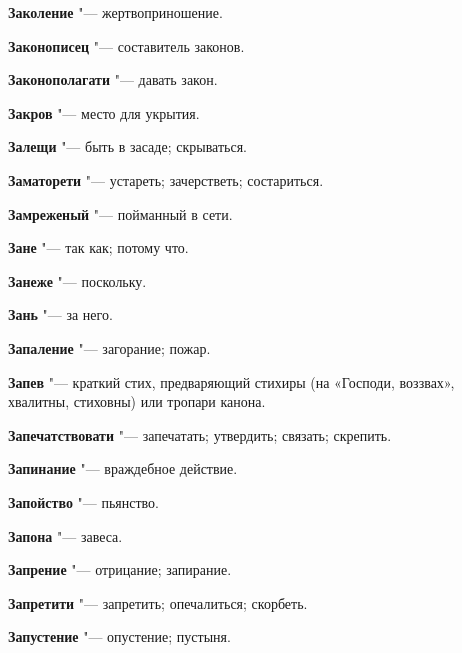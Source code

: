 \begin{mymulticols}{2}
\noindent\textbf{Заколение} "--- жертвоприношение. 




\noindent\textbf{Законописец} "--- составитель законов. 




\noindent\textbf{Законополагати} "--- давать закон. 




\noindent\textbf{Закров} "--- место для укрытия. 




\noindent\textbf{Залещи} "--- быть в засаде; скрываться. 




\noindent\textbf{Заматорети} "--- устареть; зачерстветь; состариться. 




\noindent\textbf{Замреженый} "--- пойманный в сети. 




\noindent\textbf{Зане} "--- так как; потому что. 




\noindent\textbf{Занеже} "--- поскольку. 




\noindent\textbf{Зань} "--- за него. 




\noindent\textbf{Запаление} "--- загорание; пожар. 




\noindent\textbf{Запев} "--- краткий стих, предваряющий стихиры (на «Господи, воззвах», хвалитны, стиховны) или тропари канона. 




\noindent\textbf{Запечатствовати} "--- запечатать; утвердить; связать; скрепить. 




\noindent\textbf{Запинание} "--- враждебное действие. 




\noindent\textbf{Запойство} "--- пьянство. 




\noindent\textbf{Запона} "--- завеса. 




\noindent\textbf{Запрение} "--- отрицание; запирание. 




\noindent\textbf{Запретити} "--- запретить; опечалиться; скорбеть. 




\noindent\textbf{Запустение} "--- опустение; пустыня. 





\end{mymulticols}
